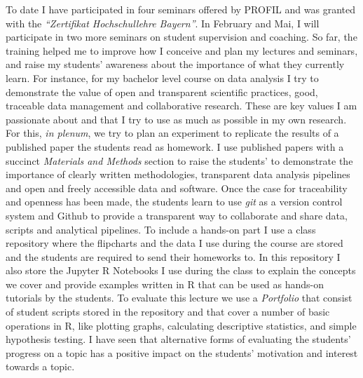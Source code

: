 \documentclass[a4paper,11pt]{article}
\begin{document}
To date I have participated in four seminars offered by PROFIL and was granted with the \emph{``Zertifikat Hochschul\-lehre Bayern''}. In February and Mai, I will participate in two more seminars on student supervision and coaching. So far, the training helped me to improve how I conceive and plan my lectures and seminars, and raise my students' awareness about the importance of what they currently learn. For instance, for my bachelor level course on data analysis I try to demonstrate the value of open and transparent scientific practices, good, traceable data management and collaborative research. These are key values I am passionate about and that I try to use as much as possible in my own research. For this, \emph{in plenum}, we try to plan an experiment to replicate the results of a published paper the students read as homework. I use published papers with a succinct \emph{Materials and Methods} section to raise the students' to demonstrate the importance of clearly written methodologies, transparent data analysis pipelines and open and freely accessible data and software. Once the case for traceability and openness has been made, the students learn to use \emph{git} as a version control system and Github to provide a transparent way to collaborate and share data, scripts and analytical pipelines. To include a hands-on part I use a class repository where the flipcharts and the data I use during the course are stored and the students are required to send their homeworks to. In this repository I also store the Jupyter R Notebooks I use during the class to explain the concepts we cover and provide examples written in R that can be used as hands-on tutorials by the students. To evaluate this lecture we use a \emph{Portfolio} that consist of student scripts stored in the repository and that cover a number of basic operations in R, like plotting graphs, calculating descriptive statistics, and simple hypothesis testing. I have seen that alternative forms of evaluating the students' progress on a topic has a positive impact on the students' motivation and interest towards a topic.\\
\end{document}
